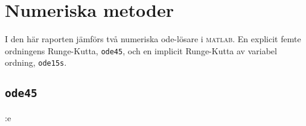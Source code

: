 \section{Numeriska metoder}
\label{sec:metoder}

I den här raporten jämförs två numeriska ode-lösare i \textsc{matlab}. En
explicit femte ordningens Runge-Kutta, \texttt{ode45}, och en implicit
Runge-Kutta av variabel ordning, \texttt{ode15s}.

\subsection{\texttt{ode45}}:e
